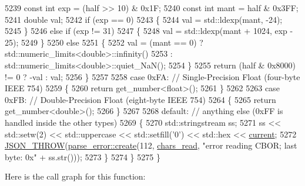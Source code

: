 \begin{DoxyCode}
5239                 \textcolor{keyword}{const} \textcolor{keywordtype}{int} exp = (half >> 10) & 0x1F;
5240                 \textcolor{keyword}{const} \textcolor{keywordtype}{int} mant = half & 0x3FF;
5241                 \textcolor{keywordtype}{double} val;
5242                 \textcolor{keywordflow}{if} (exp == 0)
5243                 \{
5244                     val = std::ldexp(mant, -24);
5245                 \}
5246                 \textcolor{keywordflow}{else} \textcolor{keywordflow}{if} (exp != 31)
5247                 \{
5248                     val = std::ldexp(mant + 1024, exp - 25);
5249                 \}
5250                 \textcolor{keywordflow}{else}
5251                 \{
5252                     val = (mant == 0) ? std::numeric\_limits<double>::infinity()
5253                           : std::numeric\_limits<double>::quiet\_NaN();
5254                 \}
5255                 \textcolor{keywordflow}{return} (half & 0x8000) != 0 ? -val : val;
5256             \}
5257 
5258             \textcolor{keywordflow}{case} 0xFA: \textcolor{comment}{// Single-Precision Float (four-byte IEEE 754)}
5259             \{
5260                 \textcolor{keywordflow}{return} get\_number<float>();
5261             \}
5262 
5263             \textcolor{keywordflow}{case} 0xFB: \textcolor{comment}{// Double-Precision Float (eight-byte IEEE 754)}
5264             \{
5265                 \textcolor{keywordflow}{return} get\_number<double>();
5266             \}
5267 
5268             \textcolor{keywordflow}{default}: \textcolor{comment}{// anything else (0xFF is handled inside the other types)}
5269             \{
5270                 std::stringstream ss;
5271                 ss << std::setw(2) << std::uppercase << std::setfill(\textcolor{charliteral}{'0'}) << std::hex << 
      \hyperlink{classnlohmann_1_1detail_1_1binary__reader_a7e994e201b215cd6d6ae28a1853f43e0}{current};
5272                 \hyperlink{json_8hpp_a6c274f6db2e65c1b66c7d41b06ad690f}{JSON\_THROW}(\hyperlink{classnlohmann_1_1detail_1_1parse__error_a9fd60ad6bce80fd99686ad332faefd37}{parse\_error::create}(112, 
      \hyperlink{classnlohmann_1_1detail_1_1binary__reader_a2dbde0b7390100efe0bfc54e21c3a34b}{chars\_read}, \textcolor{stringliteral}{"error reading CBOR; last byte: 0x"} + ss.str()));
5273             \}
5274         \}
5275     \}
\end{DoxyCode}
Here is the call graph for this function\+:
\mbox{\label{classnlohmann_1_1detail_1_1binary__reader_ab4a4a6f5ab3cc77aac374c9c889e580e}} 
